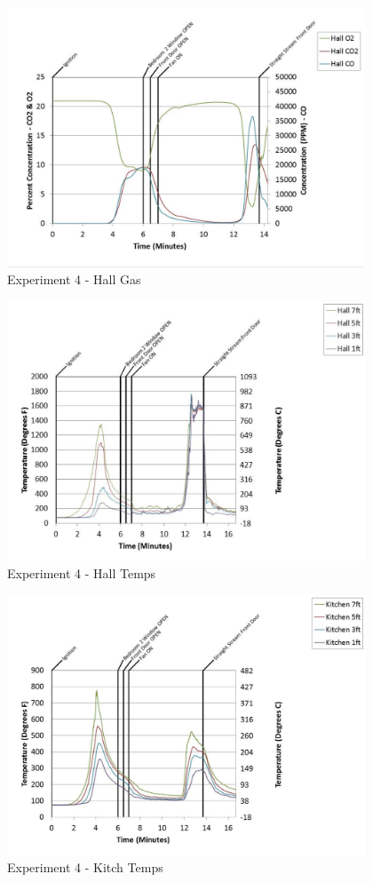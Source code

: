 \documentclass{article}
\begin{document}
\begin{appendices}
	\begin{figure}[h!]
		\centering
		\includegraphics[height=3.05in]{0_Images/Results_Charts/Exp_4_Charts/HallGas.pdf}
		\caption{Experiment 4 - Hall Gas}
	\end{figure}
 
	\clearpage

	\begin{figure}[h!]
		\centering
		\includegraphics[height=3.05in]{0_Images/Results_Charts/Exp_4_Charts/HallTemps.pdf}
		\caption{Experiment 4 - Hall Temps}
	\end{figure}
 

	\begin{figure}[h!]
		\centering
		\includegraphics[height=3.05in]{0_Images/Results_Charts/Exp_4_Charts/KitchTemps.pdf}
		\caption{Experiment 4 - Kitch Temps}
	\end{figure}
 

\end{appendices}
\end{document}
